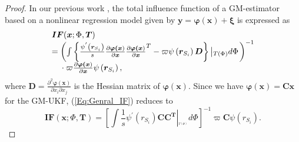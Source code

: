 \documentclass[10pt]{IEEEtran}
\begin{document}
\begin{proof}
In our previous work \cite{Junbo_GMIEKF2016}, the total influence function of a GM-estimator based on a nonlinear regression model given by $\bm{y}=\bm{\varphi}(\bm{x})+\bm{\xi}$ is expressed as
\begin{equation}
\normalsize
\begin{array}{l}
\bm{IF}(\bm{x};\Phi,\bm{T})\\
 = {\left( {\int {\left\{ {\frac{{{\psi ^{'}}\left( {{\bm{r}_{{S_i}}}} \right)}}{s}\frac{{\partial \bm{\varphi \left( {x} } \right)}}{{\partial \bm{x}}}{{\frac{{\partial \bm{\varphi \left( {x}} \right)}}{{\partial \bm{x}}}}^T} - \varpi \psi \left( {{\bm{r}_{{S_i}}}} \right)\bm{D}} \right\}\left| {_{T\left( \Phi \right)}}d\Phi \right.} } \right)^{ - 1}}\\
{\rm{ \quad }} \cdot \varpi \frac{{\partial \bm{\varphi \left( {x}} \right)}}{{\partial \bm{x}}}\psi \left( {{\bm{r}_{{S_i}}}} \right),
\end{array}
\label{Eq:Genral_IF}
\end{equation}
where $\bm{D}={\frac{{{\partial ^2}\bm{\varphi (x)}}}{{\partial {x_i}\partial {x_j}}}}$ is the Hessian matrix of $\bm{\varphi (x)}$.
Since we have $\bm{\varphi}(\bm{x})=\bm{C}\bm{x}$ for the GM-UKF, (\ref{Eq:Genral_IF}) reduces to
\begin{equation}
\bm{IF}(\bm{x};\Phi,\bm{T}) = {\left[ {\int {\frac{1}{s}{\psi ^{'}}\left( {{r_{{S_i}}}} \right)\bm{C{C}^T}\left| {_{_{_{T\left( \Phi \right)}}}d\Phi} \right.} } \right]^{ - 1}}\varpi \bm{C}\psi \left( {{r_{{S_i}}}} \right).
\label{Eq:IFfinal}
\end{equation}
\end{proof}
\end{document}
